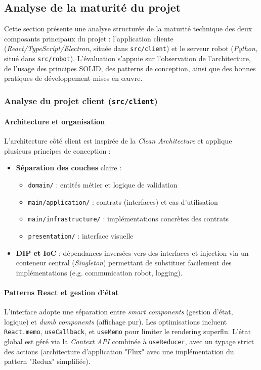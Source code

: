 \subsection{Analyse de la maturité du projet}

Cette section présente une analyse structurée de la maturité technique des deux composants principaux du projet : l’application cliente (\textit{React/TypeScript/Electron}, située dans \texttt{src/client}) et le serveur robot (\textit{Python}, situé dans \texttt{src/robot}).
L’évaluation s’appuie sur l’observation de l’architecture, de l’usage des principes SOLID, des patterns de conception, ainsi que des bonnes pratiques de développement mises en œuvre.

\subsubsection{Analyse du projet client (\texttt{src/client})}

\paragraph{Architecture et organisation}
L’architecture côté client est inspirée de la \textit{Clean Architecture} et applique plusieurs principes de conception :  
\begin{itemize}
    \item \textbf{Séparation des couches} claire :  
    \begin{itemize}
        \item \texttt{domain/} : entités métier et logique de validation
        \item \texttt{main/application/} : contrats (interfaces) et cas d'utilisation
        \item \texttt{main/infrastructure/} : implémentations concrètes des contrats
        \item \texttt{presentation/} : interface visuelle
    \end{itemize}
    \item \textbf{DIP et IoC} : dépendances inversées vers des interfaces et injection via un conteneur central (\textit{Singleton}) permettant de substituer facilement des implémentations (e.g. communication robot, logging).
\end{itemize}

\paragraph{Patterns React et gestion d’état}
L’interface adopte une séparation entre \textit{smart components} (gestion d’état, logique) et \textit{dumb components} (affichage pur).  
Les optimisations incluent \texttt{React.memo}, \texttt{useCallback}, et \texttt{useMemo} pour limiter le rendering superflu.
L’état global est géré via la \textit{Context API} combinée à \texttt{useReducer}, avec un typage strict des actions (architecture d'application "Flux" avec une implémentation du pattern "Redux" simplifiée).


